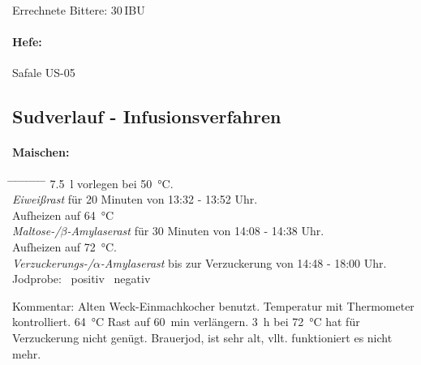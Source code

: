 \documentclass[12pt,oneside,a4paper]{scrartcl}
\begin{document}
\vspace{.25cm}
\hspace{1cm}Errechnete Bittere: 30\,IBU
%
\paragraph{Hefe:}
	Safale US-05

%
\pagebreak[3]
\subsection*{Sudverlauf - Infusionsverfahren}	
\paragraph{Maischen:}
	\begin{tabbing}\hspace{1cm} \=
		\hspace{1cm} \= \hspace{1cm} \=\hspace{1cm} \=\hspace{1cm} \=\hspace{1cm} \= \hspace{1cm} \= \hspace{1cm} \= \hspace{1cm} \= \hspace{1cm} \= \kill
		\> \SI{7,5}{\litre} vorlegen bei \SI{50}{\celsius}.\\
		\> \textit{Eiweißrast} für 20 Minuten von 13:32 - 13:52 Uhr.\\
		\> \> Aufheizen auf \SI{64}{\celsius}\\
		\> \textit{Maltose-/$\beta$-Amylaserast} für 30 Minuten von 14:08 - 14:38 Uhr.\\
		\> \> Aufheizen auf \SI{72}{\celsius}.\\
		\> \textit{Verzuckerungs-/$\alpha$-Amylaserast} bis zur Verzuckerung von 14:48 - 18:00 Uhr.\\
		\> \> \> Jodprobe: \> \> \CheckedBox \ positiv \> \> \Square \ negativ
	\end{tabbing}
	\begin{adjustwidth}{2cm}{0cm}
		\hspace{-1cm}Kommentar: Alten Weck-Einmachkocher benutzt. Temperatur mit Thermometer kontrolliert. \SI{64}{\celsius} Rast auf \SI{60}{\minute} verlängern. \SI{3}{\hour} bei \SI{72}{\celsius} hat für Verzuckerung nicht genügt. Brauerjod, ist sehr alt, vllt. funktioniert es nicht mehr.
	\end{adjustwidth}
\pagebreak[3]
\end{document}

